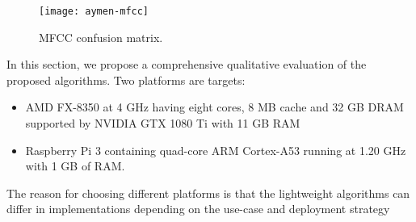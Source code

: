 \begin{figure}%
    \centering
    \texttt{[image: aymen-mfcc]}
    \caption{MFCC confusion matrix.}
    \label{aymen-stft}
\end{figure}


In this section, we propose a comprehensive qualitative evaluation of the proposed algorithms. Two platforms are targets:
\begin{itemize}
\item AMD FX-8350 at 4 GHz having eight cores, 8 MB cache and 32 GB DRAM supported by NVIDIA GTX 1080 Ti with 11 GB RAM
\item Raspberry Pi 3 containing quad-core ARM Cortex-A53 running at 1.20 GHz with 1 GB of RAM.
\end{itemize}

\noindent The reason for choosing different platforms is that the lightweight algorithms can differ in implementations depending on the use-case and deployment strategy


